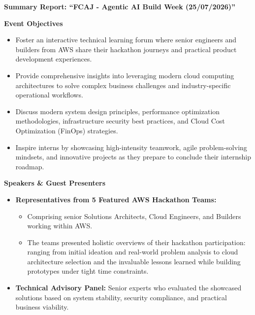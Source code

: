 \vspace{0.5em}\noindent\textbf{Summary Report: ``FCAJ - Agentic AI Build Week (25/07/2026)''}

\vspace{0.5em}\noindent\textbf{Event Objectives}

\begin{itemize}
\tightlist
\item
  Foster an interactive technical learning forum where senior engineers
  and builders from AWS share their hackathon journeys and practical
  product development experiences.
\item
  Provide comprehensive insights into leveraging modern cloud computing
  architectures to solve complex business challenges and
  industry-specific operational workflows.
\item
  Discuss modern system design principles, performance optimization
  methodologies, infrastructure security best practices, and Cloud Cost
  Optimization (FinOps) strategies.
\item
  Inspire interns by showcasing high-intensity teamwork, agile
  problem-solving mindsets, and innovative projects as they prepare to
  conclude their internship roadmap.
\end{itemize}

\vspace{0.5em}\noindent\textbf{Speakers \& Guest Presenters}

\begin{itemize}
\tightlist
\item
  \textbf{Representatives from 5 Featured AWS Hackathon Teams:}

  \begin{itemize}
  \tightlist
  \item
    Comprising senior Solutions Architects, Cloud Engineers, and
    Builders working within AWS.
  \item
    The teams presented holistic overviews of their hackathon
    participation: ranging from initial ideation and real-world problem
    analysis to cloud architecture selection and the invaluable lessons
    learned while building prototypes under tight time constraints.
  \end{itemize}
\item
  \textbf{Technical Advisory Panel:} Senior experts who evaluated the
  showcased solutions based on system stability, security compliance,
  and practical business viability.
\end{itemize}

